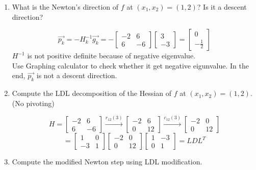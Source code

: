 \documentclass[a4paper,10pt]{article}
\begin{document}
\begin{enumerate}
\begin{enumerate}
    \item What is the Newton's direction of $f$ at $(x_1,x_2)=(1,2)$?  Is it a descent direction?

{\color{blue}
	$$\vec{p_k}=-H_k ^{-1} \vec{g_k}=-\begin{bmatrix}
-2&6\\6&-6
\end{bmatrix}\begin{bmatrix}
3\\-3
\end{bmatrix}=\begin{bmatrix}
0\\-\frac{1}{2}
\end{bmatrix}$$
$H^{-1}$ is not positive definite because of negative eigenvalue.\\
Use Graphing calculator to check whether it get negative eigunvalue. 
In the end, $\vec{p_k}$ is not a descent direction.
   

}

    \item Compute the LDL decomposition of the Hessian of $f$ at $(x_1,x_2)=(1,2)$. (No pivoting)


{\color{blue}
$$H=\begin{bmatrix}
-2&6\\6&-6
\end{bmatrix}
\stackrel{r_{12}(3)}{\longrightarrow}
\begin{bmatrix}
-2&6\\0&12
\end{bmatrix}
\stackrel{c_{12}(3)}{\longrightarrow}
\begin{bmatrix}
-2&0\\0&12
\end{bmatrix}$$
$$=\begin{bmatrix}
1&0\\-3&1
\end{bmatrix}\begin{bmatrix}
-2&0\\0&12
\end{bmatrix}\begin{bmatrix}
1&-3\\0&1
\end{bmatrix}=LDL^T$$

}
    \item Compute the modified Newton step using LDL modification.


\end{enumerate}
\end{enumerate}
\end{document}
